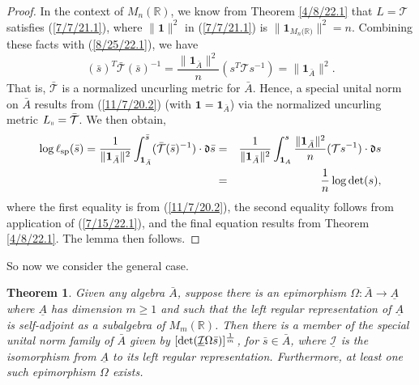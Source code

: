 \documentclass{amsart}
\numberwithin{equation}{section}
\newtheorem{theorem}{Theorem}
\theoremstyle{definition}
\numberwithin{theorem}{section}
\begin{document}
\begin{proof}
In the context of $M_n(\mathbb{R})$, we know from Theorem \ref{4/8/22.1} that $L=\mathcal{T}$ satisfies (\ref{7/7/21.1}), where $\|\mathbf{1}\|^2$ in  (\ref{7/7/21.1}) is $\|\mathbf{1}_{M_n({\mathbb{R})}}\|^2 = n$.  Combining these facts with (\ref{8/25/22.1}), we have \begin{equation}\label{9/27/23.1} (\bar{s})^T \bar{\mathcal{T}} (\bar{s})^{-1} = \frac{\|\mathbf{1}_{\bar{A}}\|^2}{n}( s^T \mathcal{T} s^{-1}) = \|\mathbf{1}_{\bar{A}}\|^2 .\end{equation} 
That is, $\mathcal{\bar{T}}$ is a normalized uncurling metric for $\bar{A}$.  Hence, a special unital norm on $\bar{A}$ results from (\ref{11/7/20.2}) (with $\mathbf{1}=\mathbf{1}_{\bar{A}}$)  via the normalized uncurling metric $L_{\shortparallel} = \bar{\mathcal{T}}$.  
  We then obtain, 
\begin{eqnarray}\nonumber \log\ell_{\rm sp}(\bar{s}) = \frac{1}{\|\mathbf{1}_{\bar{A}}\|^2} \int_{\mathbf{1}_{\bar{A}}}^{\bar{s}} (\bar{\mathcal{T}}(\bar{s})^{-1})\cdot \mathfrak{d}\bar{s}
 &=& \frac{1}{\|\mathbf{1}_{\bar{A}}\|^2} \int_{\mathbf{1}_{A}}^{s} \frac{\|\mathbf{1}_{\bar{A}}\|^2}{n}(\mathcal{T}s^{-1})\cdot \mathfrak{d}s \\ &=& \frac{1}{n} \log\text{det}(s),\label{9/27/23.2}\end{eqnarray} where the first equality is from (\ref{11/7/20.2}), the second equality follows from application of (\ref{7/15/22.1}), and the final equation results from Theorem \ref{4/8/22.1}.
The lemma then follows. 
 \end{proof} 
 

So now we consider the general case.
 
  \begin{theorem}\label{11/17/22.1}
  Given any algebra $\bar{A}$, suppose there is an epimorphism $\Omega:\bar{A}\rightarrow \underline{A}$ where $ \underline{A}$ has dimension $m\ge 1$ and such that the left regular representation of $\underline{A}$ is self-adjoint as a subalgebra of $M_m(\mathbb{R})$.  Then there is a member of the special unital norm family of  $\bar{A}$ given by $[{\rm det}(\underline{\mathcal{I}}\Omega \bar{s})]^{\frac{1}{m}}$, for $\bar{s}\in\bar{A}$, where $\underline{\mathcal{I}}$ is the isomorphism from $\underline{A}$ to its left regular representation.  Furthermore, at least one such epimorphism $\Omega$ exists. 
   \end{theorem}
 
\end{document}
